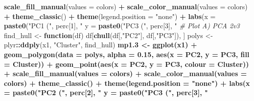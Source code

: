 \documentclass[
]{article}
\newenvironment{Shaded}{\begin{snugshade}}{\end{snugshade}}
\newcommand{\CommentTok}[1]{\textcolor[rgb]{0.56,0.35,0.01}{\textit{#1}}}
\newcommand{\ControlFlowTok}[1]{\textcolor[rgb]{0.13,0.29,0.53}{\textbf{#1}}}
\newcommand{\DataTypeTok}[1]{\textcolor[rgb]{0.13,0.29,0.53}{#1}}
\newcommand{\DecValTok}[1]{\textcolor[rgb]{0.00,0.00,0.81}{#1}}
\newcommand{\FloatTok}[1]{\textcolor[rgb]{0.00,0.00,0.81}{#1}}
\newcommand{\KeywordTok}[1]{\textcolor[rgb]{0.13,0.29,0.53}{\textbf{#1}}}
\newcommand{\NormalTok}[1]{#1}
\newcommand{\OperatorTok}[1]{\textcolor[rgb]{0.81,0.36,0.00}{\textbf{#1}}}
\newcommand{\StringTok}[1]{\textcolor[rgb]{0.31,0.60,0.02}{#1}}
\begin{document}
\begin{Shaded}
\begin{Highlighting}[]
{{{{{{{{{{{{{{{{{\StringTok{  }\KeywordTok{scale_fill_manual}\NormalTok{(}\DataTypeTok{values =}\NormalTok{ colors) }\OperatorTok{+}
\StringTok{  }\KeywordTok{scale_color_manual}\NormalTok{(}\DataTypeTok{values =}\NormalTok{ colors) }\OperatorTok{+}
\StringTok{  }\KeywordTok{theme_classic}\NormalTok{() }\OperatorTok{+}\StringTok{ }
\StringTok{  }\KeywordTok{theme}\NormalTok{(}\DataTypeTok{legend.position =} \StringTok{"none"}\NormalTok{) }\OperatorTok{+}
\StringTok{  }\KeywordTok{labs}\NormalTok{(}\DataTypeTok{x =} \KeywordTok{paste0}\NormalTok{(}\StringTok{"PC1 ("}\NormalTok{, perc[}\DecValTok{1}\NormalTok{], }\StringTok{"%
       \DataTypeTok{y =} \KeywordTok{paste0}\NormalTok{(}\StringTok{"PC3 ("}\NormalTok{, perc[}\DecValTok{3}\NormalTok{], }\StringTok{"%
\CommentTok{# Plot A) PCA 2v3}
\NormalTok{find_hull <-}\StringTok{ }\ControlFlowTok{function}\NormalTok{(df) df[}\KeywordTok{chull}\NormalTok{(df[,}\StringTok{"PC2"}\NormalTok{], df[,}\StringTok{"PC3"}\NormalTok{]), ]}
\NormalTok{polys <-}\StringTok{ }\NormalTok{plyr}\OperatorTok{::}\KeywordTok{ddply}\NormalTok{(x1, }\StringTok{"Cluster"}\NormalTok{, find_hull) }\OperatorTok{%
\NormalTok{mp1}\FloatTok{.3}\NormalTok{ <-}\StringTok{ }\KeywordTok{ggplot}\NormalTok{(x1) }\OperatorTok{+}
\StringTok{  }\KeywordTok{geom_polygon}\NormalTok{(}\DataTypeTok{data =}\NormalTok{ polys, }\DataTypeTok{alpha =} \FloatTok{0.15}\NormalTok{, }\KeywordTok{aes}\NormalTok{(}\DataTypeTok{x =}\NormalTok{ PC2, }\DataTypeTok{y =}\NormalTok{ PC3, }\DataTypeTok{fill =}\NormalTok{ Cluster)) }\OperatorTok{+}
\StringTok{  }\KeywordTok{geom_point}\NormalTok{(}\KeywordTok{aes}\NormalTok{(}\DataTypeTok{x =}\NormalTok{ PC2, }\DataTypeTok{y =}\NormalTok{ PC3, }\DataTypeTok{colour =}\NormalTok{ Cluster)) }\OperatorTok{+}
\StringTok{  }\KeywordTok{scale_fill_manual}\NormalTok{(}\DataTypeTok{values =}\NormalTok{ colors) }\OperatorTok{+}
\StringTok{  }\KeywordTok{scale_color_manual}\NormalTok{(}\DataTypeTok{values =}\NormalTok{ colors) }\OperatorTok{+}
\StringTok{  }\KeywordTok{theme_classic}\NormalTok{() }\OperatorTok{+}\StringTok{ }
\StringTok{  }\KeywordTok{theme}\NormalTok{(}\DataTypeTok{legend.position =} \StringTok{"none"}\NormalTok{) }\OperatorTok{+}
\StringTok{  }\KeywordTok{labs}\NormalTok{(}\DataTypeTok{x =} \KeywordTok{paste0}\NormalTok{(}\StringTok{"PC2 ("}\NormalTok{, perc[}\DecValTok{2}\NormalTok{], }\StringTok{"%
       \DataTypeTok{y =} \KeywordTok{paste0}\NormalTok{(}\StringTok{"PC3 ("}\NormalTok{, perc[}\DecValTok{3}\NormalTok{], }\StringTok{"%
}}}}}}}}}}}}}}}}}}}}}}
\end{Highlighting}
\end{Shaded}
\end{document}
